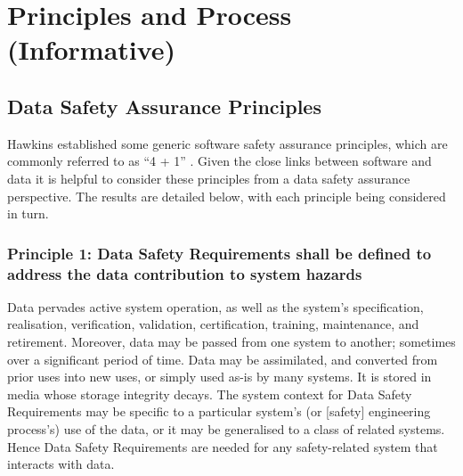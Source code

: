 %
%
\section{Principles and Process (Informative)} \label{bkm:principlesprocess}


\subsection{Data Safety Assurance Principles}
Hawkins  established some generic software safety assurance principles, which are commonly referred to as ``4 + 1'' \cite{citation:hawkins2013principles}. Given the close links between software and data it is helpful to consider these principles from a data safety assurance perspective. The results are detailed below, with each principle being considered in turn.

\subsubsection{Principle 1: Data Safety Requirements shall be defined to address the data contribution to system hazards}
Data pervades active system operation, as well as the system's specification, realisation, verification, validation, certification,  training, maintenance, and retirement. Moreover, data may be passed from one system to another; sometimes over a significant period of time. Data may be assimilated, and converted from prior uses into new uses, or simply used as-is by many systems. It is stored in media whose storage \gls{integrity} decays. The system context for Data Safety Requirements may be specific to a particular system's (or [safety] engineering process's) use of the data, or it may be generalised to a class of related systems. Hence Data Safety Requirements are needed for any safety-related system that interacts with data.

